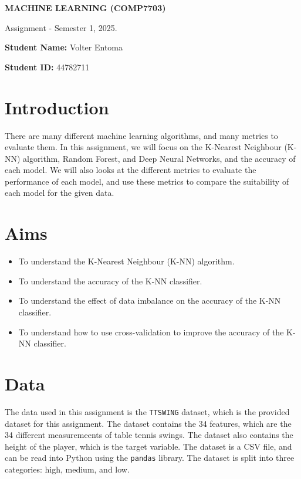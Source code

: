 \documentclass[12pt]{article}
\begin{document}
\begin{center}

{\Large  {\bf MACHINE LEARNING (COMP7703)}

Assignment - Semester 1, 2025.

\vspace{20pt}

{\large \textbf{Student Name:} Volter Entoma}
\vspace{10pt}

{\large \textbf{Student ID:} 44782711}

}
\end{center}

\vspace{20pt}

\section{Introduction}
\noindent
There are many different machine learning algorithms, and many metrics to evaluate them. In this assignment, we will focus on the K-Nearest Neighbour (K-NN) algorithm, Random Forest, and Deep Neural Networks, and the accuracy of each model. We will also looks at the different metrics to evaluate the performance of each model, and use these metrics to compare the suitability of each model for the given data.

\vspace{20pt}

\section{Aims}
\noindent
\begin{itemize}
	\item To understand the K-Nearest Neighbour (K-NN) algorithm.
	\item To understand the accuracy of the K-NN classifier.
	\item To understand the effect of data imbalance on the accuracy of the K-NN classifier.
	\item To understand how to use cross-validation to improve the accuracy of the K-NN classifier.
\end{itemize}

\vspace{20pt}

\section{Data}
\noindent
The data used in this assignment is the \texttt{TTSWING} dataset, which is the provided dataset for this assignment. The dataset contains the 34 features, which are the 34 different measuremeents of table tennis swings. The dataset also contains the height of the player, which is the target variable. The dataset is a CSV file, and can be read into Python using the \texttt{pandas} library. The dataset is split into three categories: high, medium, and low.
\end{document}
